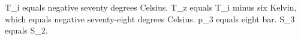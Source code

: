 T_i equals negative seventy degrees Celsius.  
T_z equals T_i minus six Kelvin, which equals negative seventy-eight degrees Celsius.  
p_3 equals eight bar.  
S_3 equals S_2.